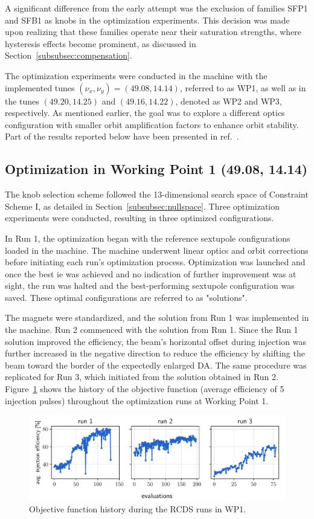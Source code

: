 A significant difference from the early attempt was the exclusion of families SFP1 and SFB1 as knobs in the optimization experiments. This decision was made upon realizing that these families operate near their saturation strengths, where hysteresis effects become prominent, as discussed in Section~\ref{subsubsec:compensation}.

The optimization experiments were conducted in the machine with the implemented tunes $(\nu_x,\nu_y)=(49.08, 14.14)$, referred to as \gls*{WP1}, as well as in the tunes $(49.20, 14.25)$ and $(49.16, 14.22)$, denoted as \gls*{WP2} and \gls*{WP3}, respectively. As mentioned earlier, the goal was to explore a different optics configuration with smaller orbit amplification factors to enhance orbit stability. Part of the results reported below have been presented in ref.~\cite{velloso_online_2023}.

\subsection{Optimization in Working Point 1 (49.08, 14.14)}
The knob selection scheme followed the 13-dimensional search space of Constraint Scheme I, as detailed in Section~\ref{subsubsec:nullspace}. Three optimization experiments were conducted, resulting in three optimized configurations.

In Run 1, the optimization began with the reference sextupole configurations loaded in the machine. The machine underwent linear optics and orbit corrections before initiating each run's optimization process. Optimization was launched and once the best \gls*{ie} was achieved and no indication of further improvement was at sight, the run was halted and the best-performing sextupole configuration was saved. These optimal configurations are referred to as "solutions".

The magnets were standardized, and the solution from Run 1 was implemented in the machine. Run 2 commenced with the solution from Run 1. Since the Run 1 solution improved the efficiency, the beam's horizontal offset during injection was further increased in the negative direction to reduce the efficiency by shifting the beam toward the border of the expectedly enlarged \gls*{DA}. The same procedure was replicated for Run 3, which initiated from the solution obtained in Run 2. Figure~\ref{fig:wp1_history} shows the history of the objective function (average efficiency of 5 injection pulses) throughout the optimization runs at Working Point 1.
\begin{figure}[tb]
    \centering
    \includegraphics[width=\columnwidth]{Images/wp1_objfunc_hist.pdf}
    \caption[Objective function history during the RCDS runs in WP1.]{Objective function history during the \gls*{RCDS} runs in \gls*{WP1}.}
    \label{fig:wp1_history}
\end{figure}
